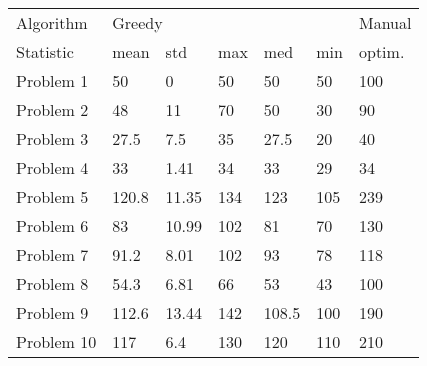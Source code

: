 \begin{tabular}{lllllll}
\toprule
Algorithm & \multicolumn{5}{l}{Greedy} & Manual \\
Statistic &   mean &    std &  max &    med &  min & optim. \\
\midrule
Problem 1  &     50 &      0 &   50 &     50 &   50 &    100 \\
Problem 2  &     48 &     11 &   70 &     50 &   30 &     90 \\
Problem 3  &   27.5 &    7.5 &   35 &   27.5 &   20 &     40 \\
Problem 4  &     33 &   1.41 &   34 &     33 &   29 &     34 \\
Problem 5  &  120.8 &  11.35 &  134 &    123 &  105 &    239 \\
Problem 6  &     83 &  10.99 &  102 &     81 &   70 &    130 \\
Problem 7  &   91.2 &   8.01 &  102 &     93 &   78 &    118 \\
Problem 8  &   54.3 &   6.81 &   66 &     53 &   43 &    100 \\
Problem 9  &  112.6 &  13.44 &  142 &  108.5 &  100 &    190 \\
Problem 10 &    117 &    6.4 &  130 &    120 &  110 &    210 \\
\bottomrule
\end{tabular}
